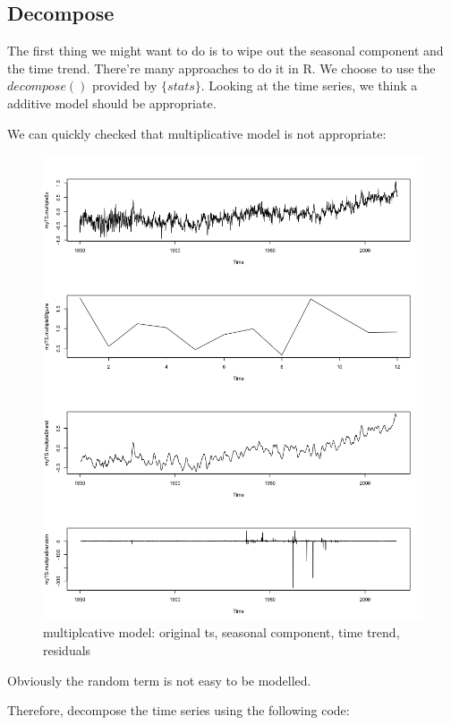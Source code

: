 \documentclass[a4paper, 11pt]{article}
\begin{document}
\subsection{Decompose}
The first thing we might want to do is to wipe out the seasonal component and the time trend. There're many approaches to do it in R. We choose to use the $decompose()$ provided by $\{stats\}$. Looking at the time series, we think a additive model should be appropriate. \par
We can quickly checked that multiplicative model is not appropriate:
\begin{figure}[H]
\centering
\caption{multiplcative model: original ts, seasonal component, time trend, residuals}
\includegraphics[scale=.40]{component2.png}
\end{figure}
Obviously the random term is not easy to be modelled.\par
Therefore, decompose the time series using the following code:
\end{document}
